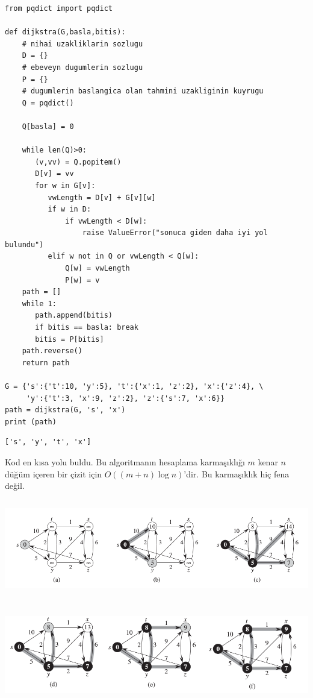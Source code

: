 \documentclass[12pt,fleqn]{article}\usepackage{../../common}
\begin{document}
\begin{verbatim}
from pqdict import pqdict

def dijkstra(G,basla,bitis):
    # nihai uzakliklarin sozlugu
    D = {}  
    # ebeveyn dugumlerin sozlugu
    P = {}  
    # dugumlerin baslangica olan tahmini uzakliginin kuyrugu
    Q = pqdict() 

    Q[basla] = 0

    while len(Q)>0:
       (v,vv) = Q.popitem()
       D[v] = vv
       for w in G[v]:
          vwLength = D[v] + G[v][w]
          if w in D:
              if vwLength < D[w]:
                  raise ValueError("sonuca giden daha iyi yol bulundu")
          elif w not in Q or vwLength < Q[w]:
              Q[w] = vwLength
              P[w] = v
    path = []
    while 1:
       path.append(bitis)
       if bitis == basla: break
       bitis = P[bitis]
    path.reverse()
    return path

G = {'s':{'t':10, 'y':5}, 't':{'x':1, 'z':2}, 'x':{'z':4}, \
     'y':{'t':3, 'x':9, 'z':2}, 'z':{'s':7, 'x':6}}
path = dijkstra(G, 's', 'x')
print (path)
\end{verbatim}

\begin{verbatim}
['s', 'y', 't', 'x']
\end{verbatim}

Kod en kısa yolu buldu. Bu algoritmanın hesaplama karmaşıklığı $m$ kenar
$n$ düğüm içeren bir çizit için $O((m+n) \log n)$'dir. Bu karmaşıklık hiç
fena değil. 

\includegraphics[height=4.2cm]{dijks_01.png}

\includegraphics[height=4.2cm]{dijks_02.png}
\end{document}
